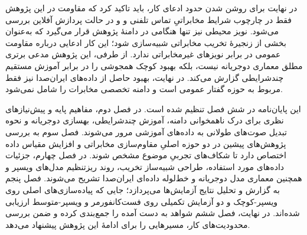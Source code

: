 در نهایت برای روشن شدن حدود ادعای کار، باید تاکید کرد که مقاومت در این پژوهش فقط در چارچوب شرایط مخابراتیِ تماس تلفنی و  و در حالت پردازش آفلاین بررسی می‌شود. نویز محیطی نیز تنها هنگامی در دامنهٔ پژوهش قرار می‌گیرد که به‌عنوان بخشی از زنجیرهٔ تخریب مخابراتی شبیه‌سازی شود؛ این کار ادعایی درباره مقاومت عمومی در برابر نویزهای غیرمخابراتی ندارد. از طرفی، این پژوهش مدعی برتری مطلق معماری دوجریانه نیست، بلکه بهبود کوچک همجوشی را در برابر آموزش مستقیم چندشرایطی گزارش می‌کند. در نهایت، بهبود حاصل از داده‌های ایران‌صدا نیز فقط مربوط به حوزه گفتار عمومی است و دامنه تخصصی مخابرات را شامل نمی‌شود.


این پایان‌نامه در شش فصل تنظیم شده است. در فصل دوم، مفاهیم پایه و پیش‌نیازهای نظری برای درک ناهمخوانی دامنه، آموزش چندشرایطی، بهسازی دوجریانه و نحوه تبدیل صوت‌های طولانی به داده‌های آموزشی مرور می‌شوند. فصل سوم به بررسی پژوهش‌های پیشین در دو حوزه اصلیِ مقاوم‌سازی مخابراتی و افزایش مقیاس داده اختصاص دارد تا شکاف‌های تجربیِ موضوع مشخص شوند. در فصل چهارم، جزئیات داده‌های مورد استفاده، طراحی شبیه‌ساز تخریب، روند ریزتنظیم مدل‌های ویسپر و همچنین معماری مدل دوجریانه و خط‌لوله داده‌ای ایران‌صدا تشریح می‌شوند. فصل پنجم به گزارش و تحلیل نتایج آزمایش‌ها می‌پردازد؛ جایی که پیاده‌سازی‌های اصلی روی ویسپر-کوچک و دو آزمایش تکمیلی روی فست‌کانفورمر و ویسپر-متوسط ارزیابی شده‌اند. در نهایت، فصل ششم شواهد به دست آمده را جمع‌بندی کرده و ضمن بررسی محدودیت‌های کار، مسیرهایی را برای ادامهٔ این پژوهش پیشنهاد می‌دهد.
